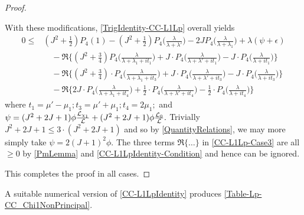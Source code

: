\documentclass[12pt,psamsfonts]{amsart}
\theoremstyle{definition}
\theoremstyle{remark}
\numberwithin{equation}{section}
\begin{document}
\begin{proof}
\begin{enumerate}[(i)]
	 With these modifications, \eqref{TrigIdentity-CC-L1Lp} overall yields
	\begin{equation}
	\begin{aligned}
	0 \leq & (J^2+\tfrac{1}{2}) P_4(1) -  (J^2+\tfrac{1}{2}) P_4\big( \frac{\lambda}{\lambda+\lambda'} \big) - 2J P_4\big( \frac{\lambda}{\lambda+\lambda_1}\big) + \lambda (\psi + \epsilon)  \\
	& \quad - \Re\Big\{  (J^2+\tfrac{3}{4}) P_4\big( \frac{\lambda}{\lambda+\lambda_1+it_1} \big) + J \cdot P_4\big( \frac{\lambda}{\lambda+\lambda' + it_1}\big) - J \cdot P_4\big( \frac{\lambda}{\lambda+it_1}\big)\Big\} \\
	& \quad - \Re\Big\{ (J^2 + \tfrac{3}{4}) \cdot P_4\big( \frac{\lambda}{\lambda+\lambda_1+it_3} \big) + J \cdot P_4\big( \frac{\lambda}{\lambda+\lambda' + it_3}\big)- J \cdot P_4\big( \frac{\lambda}{\lambda+it_3}\big)\Big\} \\
	& \quad - \Re\Big\{ 2J \cdot P_4\big( \frac{\lambda}{\lambda+\lambda_1+it_4} \big) + \tfrac{1}{2} \cdot P_4\big( \frac{\lambda}{\lambda+\lambda' + it_4}\big)- \tfrac{1}{2} \cdot P_4\big( \frac{\lambda}{\lambda+it_4}\big)\Big\}
	\end{aligned}
	\label{CC-L1Lp-Case3}
	\end{equation}
	where $t_1 = \mu' - \mu_1; t_3 = \mu' + \mu_1; t_4 = 2\mu_1;$ and $\psi = (J^2 + 2J+1) \phi \tfrac{\mathcal{L}_{\chi_1}}{\mathcal{L}} + (J^2 + 2J + 1) \phi \tfrac{\mathcal{L}_0}{\mathcal{L}}.$ Trivially $J^2 + 2J+1 \leq 3 \cdot(J^2 + 2J+1)$ and so by \cref{QuantityRelations}, we may  more simply take $\psi =  2(J+1)^2 \phi$. The three terms $\Re\{ \dots \}$ in \eqref{CC-L1Lp-Case3} are all $\geq 0$ by \cref{PmLemma} and \eqref{CC-L1LpIdentity-Condition} and hence can be ignored.
\end{enumerate}
This completes the proof in all cases. 
\end{proof}

A suitable numerical version of \cref{CC-L1LpIdentity} produces \cref{Table-Lp-CC_Chi1NonPrincipal}.
\end{document}
